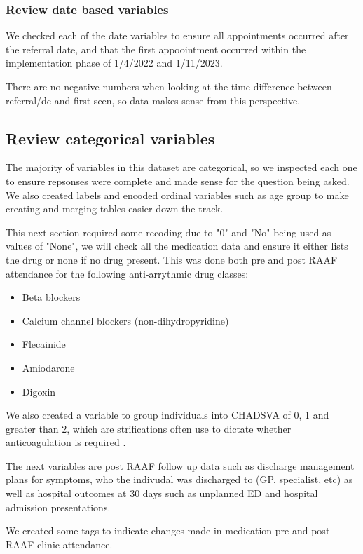\documentclass[11pt]{article}
\begin{document}
\subsubsection{Review date based variables}
We checked each of the date variables to ensure all appointments occurred after the referral date, and that the first appoointment occurred within the implementation phase of 1/4/2022 and 1/11/2023. 
\color{violet}
\begin{stlog}\end{stlog}
\color{black}
There are no negative numbers when looking at the time difference between referral/dc and first seen, so data makes sense from this perspective.

\subsection{Review categorical variables}
The majority of variables in this dataset are categorical, so we inspected each one to ensure repsonses were complete and made sense for the question being asked. We also created labels and encoded ordinal variables such as age group to make creating and merging tables easier down the track. 
\color{violet}
\begin{stlog}\end{stlog}
\color{black}
This next section required some recoding due to "0" and "No" being used as values of "None", we will check all the medication data and ensure it either lists the drug or none if no drug present. This was done both pre and post RAAF attendance for the following anti-arrythmic drug classes:
\begin{itemize}
	\item Beta blockers
	\item Calcium channel blockers (non-dihydropyridine)
	\item Flecainide
	\item Amiodarone
	\item Digoxin
\end{itemize}

We also created a variable to group individuals into CHADSVA of 0, 1 and greater than 2, which are strifications often use to dictate whether anticoagulation is required \cite{escaf2024}. 
\color{violet}
\begin{stlog}\end{stlog}
\color{black}
The next variables are post RAAF follow up data such as discharge management plans for symptoms, who the indivudal was discharged to (GP, specialist, etc) as well as hospital outcomes at 30 days such as unplanned ED and hospital admission presentations. 
\color{violet}
\begin{stlog}\end{stlog}
\color{black}
We created some tags to indicate changes made in medication pre and post RAAF clinic attendance. 
\color{violet}
\begin{stlog}\end{stlog}
\color{black}
\end{document}
